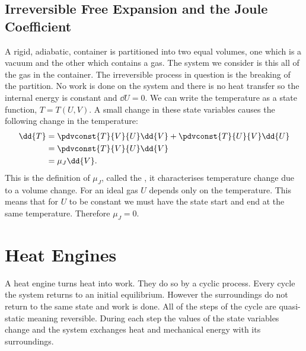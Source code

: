     \subsection{Irreversible Free Expansion and the Joule Coefficient}\label{sec:irreversible free expansion and the Joule coefficient}
    A rigid, adiabatic, container is partitioned into two equal volumes, one which is a vacuum and the other which contains a gas.
    The system we consider is this all of the gas in the container.
    The irreversible process in question is the breaking of the partition.
    No work is done on the system and there is no heat transfer so the internal energy is constant and \(\dd{U} = 0\).
    We can write the temperature as a state function, \(T = T(U, V)\).
    A small change in these state variables causes the following change in the temperature:
    \begin{align*}
        \dd{T} &= \pdvconst{T}{V}{U}\dd{V} + \pdvconst{T}{U}{V}\dd{U}\\
        &= \pdvconst{T}{V}{U}\dd{V}\\
        &= \mu_J\dd{V}.
    \end{align*}
    This is the definition of \(\mu_J\), called the , it characterises temperature change due to a volume change.
    For an ideal gas \(U\) depends only on the temperature.
    This means that for \(U\) to be constant we must have the state start and end at the same temperature.
    Therefore \(\mu_J = 0\).
    
    \section{Heat Engines}
    A heat engine turns heat into work.
    They do so by a cyclic process.
    Every cycle the system returns to an initial equilibrium.
    However the surroundings do not return to the same state and work is done.
    All of the steps of the cycle are quasi-static meaning reversible.
    During each step the values of the state variables change and the system exchanges heat and mechanical energy with its surroundings.
    
